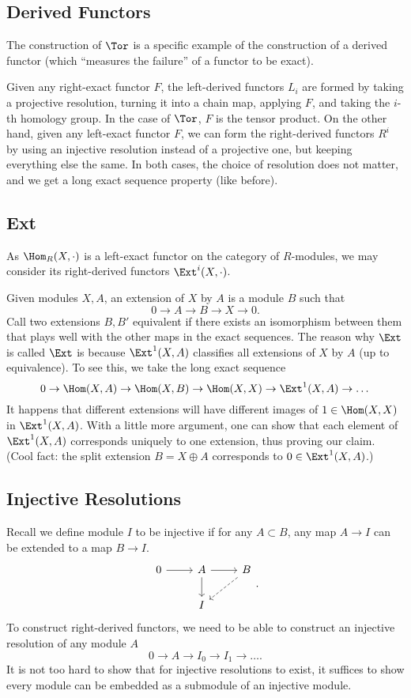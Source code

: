 \subsection{Derived Functors}
The construction of $\Tor$ is a specific example of the construction of a derived functor (which ``measures the failure'' of a functor to be exact).

Given any right-exact functor $F$, the left-derived functors $L_i$ are formed by taking a projective resolution, turning it into a chain map, applying $F$, and taking the $i$-th homology group. In the case of $\Tor$, $F$ is the tensor product. On the other hand, given any left-exact functor $F$, we can form the right-derived functors $R^i$ by using an injective resolution instead of a projective one, but keeping everything else the same. In both cases, the choice of resolution does not matter, and we get a long exact sequence property (like before).

\subsection{Ext}
As $\Hom_R(X, \cdot)$ is a left-exact functor on the category of $R$-modules, we may consider its right-derived functors $\Ext^i(X, \cdot)$.

Given modules $X, A$, an extension of $X$ by $A$ is a module $B$ such that
\[
    0 \to A \to B \to X \to 0.
\]
Call two extensions $B, B'$ equivalent if there exists an isomorphism between them that plays well with the other maps in the exact sequences. The reason why $\Ext$ is called $\Ext$ is because $\Ext^1(X,A)$ classifies all extensions of $X$ by $A$ (up to equivalence). To see this, we take the long exact sequence
\[
    0 \to \Hom(X, A) \to \Hom(X, B) \to \Hom(X, X) \to \Ext^1(X, A) \to \dots
\]
It happens that different extensions will have different images of $1 \in \Hom(X,X)$ in $\Ext^1(X,A)$. With a little more argument, one can show that each element of $\Ext^1(X,A)$ corresponds uniquely to one extension, thus proving our claim. (Cool fact: the split extension $B = X \oplus A$ corresponds to $0 \in \Ext^1(X,A)$.) 

\subsection{Injective Resolutions}
Recall we define module $I$ to be injective if for any $A \subset B$, any map $A \to I$ can be extended to a map $B \to I$.
\[
    \begin{tikzcd}
    0 \arrow[r] & A \arrow[r] \arrow[d] & B \arrow[ld, dashed] \\
                & I                     &                     
    \end{tikzcd}.
\]
To construct right-derived functors, we need to be able to construct an injective resolution of any module $A$
\[
    0 \to A \to I_0 \to I_1 \to \dots.
\]
It is not too hard to show that for injective resolutions to exist, it suffices to show every module can be embedded as a submodule of an injective module.

